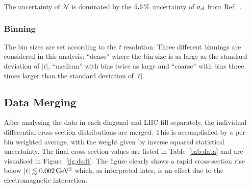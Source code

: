The uncertainty of $\mathcal{N}$ is dominated by the $5.5\,{\rm \%}$ uncertainty of $\sigma_{\rm el}$ from Ref.~\cite{totem-13tev-90m}.





\subsubsection{Binning}
\label{sec:binning}

The bin sizes are set according to the $t$ resolution. Three different binnings are considered in this analysis: ``dense'' where the bin size is as large as the standard deviation of $|t|$, ``medium'' with bins twice as large and ``coarse'' with bins three times larger than the standard deviation of $|t|$.




\subsection{Data Merging}
\label{sec:data merging}

After analysing the data in each diagonal and LHC fill separately, the individual differential cross-section distributions are merged. This is accomplished by a per-bin weighted average, with the weight given by inverse squared statistical uncertainty. The final cross-section values are listed in Table~\ref{tab:data} and are visualised in Figure~\ref{fig:dsdt}. The figure clearly shows a rapid cross-section rise below $|t| \lesssim 0.002\,{\rm GeV^2}$ which, as interpreted later, is an effect due to the electromagnetic interaction.

